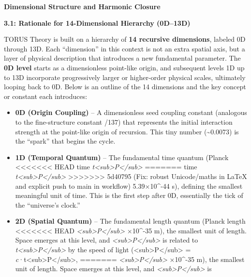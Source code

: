 \documentclass[]{article}
\begin{document}
{\textbf{Dimensional Structure and Harmonic Closure}

\textbf{3.1: Rationale for 14-Dimensional Hierarchy (0D--13D)}

TORUS Theory is built on a hierarchy of \textbf{14 recursive
dimensions}, labeled 0D through 13D. Each ``dimension'' in this context
is not an extra spatial axis, but a layer of physical description that
introduces a new fundamental parameter. The \textbf{0D level} starts as
a dimensionless point-like origin, and subsequent levels 1D up to 13D
incorporate progressively larger or higher-order physical scales,
ultimately looping back to 0D. Below is an outline of the 14 dimensions
and the key concept or constant each introduces:

\begin{itemize}
\item
  \textbf{0D (Origin Coupling)} -- A dimensionless seed coupling
  constant (analogous to the fine-structure constant \alpha {}/137) that
  represents the initial interaction strength at the point-like origin
  of recursion​. This tiny number (\textasciitilde{}0.0073) is the
  ``spark'' that begins the cycle.
\item
  \textbf{1D (Temporal Quantum)} -- The fundamental time quantum (Planck
<<<<<<< HEAD
  time \emph{t\textless sub\textgreater P\textless/sub\textgreater{}} \approx
=======
  time
  \emph{t\textless{}sub\textgreater{}P\textless{}/sub\textgreater{}} \approx
>>>>>>> 5d40795 (Fix: robust Unicode/maths in LaTeX and explicit push to main in workflow)
  5.39×10\^{}-44 s), defining the smallest meaningful unit of time. This
  is the first step after 0D, essentially the tick of the ``universe's
  clock.''
\item
  \textbf{2D (Spatial Quantum)} -- The fundamental length quantum
  (Planck length
<<<<<<< HEAD
  \emph{\ell\textless sub\textgreater P\textless/sub\textgreater{}} ×10\^{}-35 m), the smallest unit of length\hspace{0pt}. Space
  emerges at this level, and
  \emph{\ell\textless sub\textgreater P\textless/sub\textgreater{}} is
  related to
  \emph{t\textless sub\textgreater P\textless/sub\textgreater{}} by the
  speed of light
  (\ell\textless sub\textgreater P\textless/sub\textgreater{} =
  \emph{c}·t\textless sub\textgreater P\textless/sub\textgreater,
=======
  \emph{\ell\textless{}sub\textgreater{}P\textless{}/sub\textgreater{}} ×10\^{}-35 m), the smallest unit of length​. Space emerges at
  this level, and
  \emph{\ell\textless{}sub\textgreater{}P\textless{}/sub\textgreater{}} is

\end{itemize}}
\end{document}
